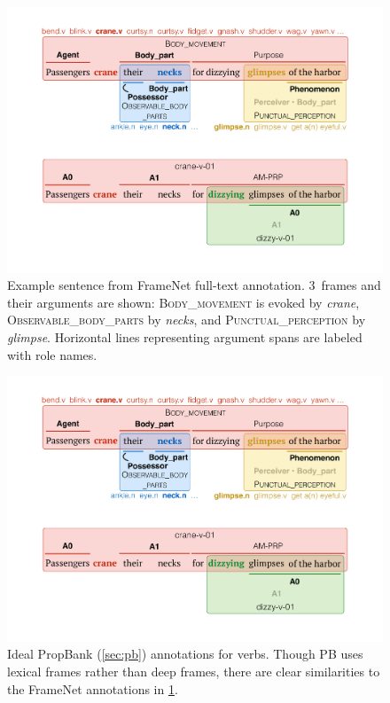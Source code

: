 \documentclass[11pt,a4paper]{article}
\newcommand{\fnf}[1]{\textsc{\textsf{#1}}} %
\begin{document}
\begin{figure}
\includegraphics[width=\columnwidth]{fig/harbor-fn.pdf}
\caption{Example sentence from FrameNet full-text annotation. 
3~frames and their arguments are shown: 
\fnf{Body\_movement} is evoked by \textit{crane},
\fnf{Observable\_body\_parts} by \textit{necks}, 
and \fnf{Punctual\_perception} by \textit{glimpse}.
Horizontal lines representing argument spans 
are labeled with role names.
}
\label{fig:harbor-fn}
\end{figure}

\begin{figure}
\includegraphics[width=\columnwidth]{fig/harbor-pb.pdf}
\caption{Ideal PropBank (\cref{sec:pb}) annotations for verbs. Though PB uses lexical frames rather than deep frames,
there are clear similarities to the FrameNet annotations in \cref{fig:harbor-fn}.}
\label{fig:harbor-pb}
\end{figure}
\end{document}
